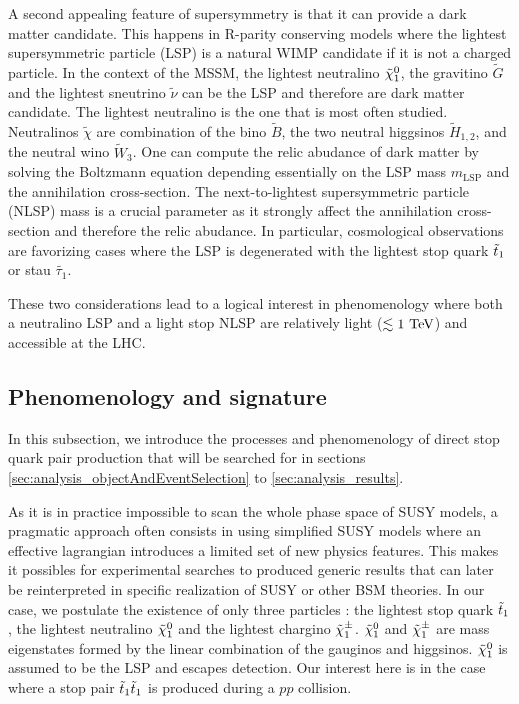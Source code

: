         A second appealing feature of supersymmetry is that it can provide a dark matter
        candidate. This happens in R-parity conserving models where the lightest supersymmetric
        particle (LSP) is a natural WIMP candidate if it is not a charged particle. In the
        context of the MSSM, the lightest neutralino $\tilde{\chi}_1^0$, the gravitino $\tilde{G}$
        and the lightest sneutrino $\tilde{\nu}$ can be the LSP and therefore are dark matter
        candidate. The lightest neutralino is the one that is most often studied. Neutralinos
        $\tilde{\chi}$ are combination of the bino $\tilde{B}$, the two neutral higgsinos
        $\tilde{H}_{1,2}$, and the neutral wino $\tilde{W}_3$. One can compute the relic
        abudance of dark matter by solving the Boltzmann equation \cite{EllisDarkMatter}
        depending essentially on the LSP mass $m_{\text{LSP}}$ and the annihilation cross-section.
        The next-to-lightest supersymmetric particle (NLSP) mass is a crucial parameter as
        it strongly affect the annihilation cross-section and therefore the relic abudance.
        In particular, cosmological observations are favorizing cases where the LSP is
        degenerated with the lightest stop quark $\tilde{t}_1$ or stau $\tilde{\tau_1}$.

        These two considerations lead to a logical interest in phenomenology where both a
        neutralino LSP and a light stop NLSP are relatively light ($\lesssim 1~\text{TeV}$) and
        accessible at the LHC.

        \subsection{Phenomenology and signature}

        In this subsection, we introduce the processes and phenomenology of direct stop
        quark pair production that will be searched for in sections
        \ref{sec:analysis_objectAndEventSelection} to \ref{sec:analysis_results}.

        As it is in practice impossible to scan the whole phase space of SUSY models, a
        pragmatic approach often consists in using simplified SUSY models where an
        effective lagrangian introduces a limited set of new physics features. This makes
        it possibles for experimental searches to produced generic results that can later
        be reinterpreted in specific realization of SUSY \cite{LiemSMS, SmodelS}
        or other BSM theories. In our case, we postulate the existence of only three
        particles : the lightest stop quark $\tilde{t}_1$, the lightest neutralino $\tilde{\chi}_1^0$
        and the lightest chargino $\tilde{\chi}_1^\pm$. $\tilde{\chi}_1^0$ and $\tilde{\chi}_1^\pm$ are mass
        eigenstates formed by the linear combination of the gauginos and  higgsinos.
        $\tilde{\chi}_1^0$ is assumed to be the LSP and escapes detection. Our interest here
        is in the case where a stop pair $\tilde{t}_1\tilde{t}_1$ is produced during a $pp$ collision.

